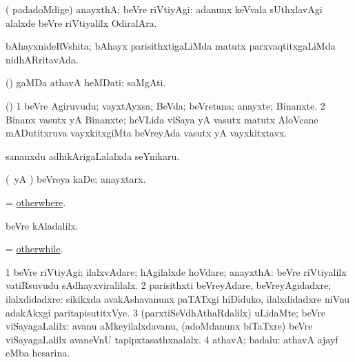 \bentry
{}
\gl{\kirxvi}
\bmng
( padadoMdige) anayxthA; beVre riVtiyAgi:  adanunx keVvala sUthxlavAgi alalxde beVre riVtiyalilx OdiralAra. 
\emng
\eentry

\bentry
{}
\gl{\gu}
\bmng
bAhayxnideRVshita; bAhayx parisithxtigaLiMda matutx parxvaqtitxgaLiMda nidhARritavAda. 
\emng
\eentry

\bentry
{}
\gl{\nA}
\bmng
(\AmA) gaMDa athavA heMDati; saMgAti. 
\emng
\eentry

\bentry
{}
\gl{\nA}
\bmng
(\viparx) 
\bnum
\num{1} beVre Agiruvudu; vayxtAyxsa; BeVda; beVretana; anayxte; Binanxte. 
\num{2} Binanx vasutx yA Binanxte; heVLida viSaya yA vasutx matutx AloVcane mADutitxruva vayxkitxgiMta beVreyAda vasutx yA vayxkitxtavx. 
\enum
\emng
\eentry

\bentry
{}
\gl{\nA}
\bmng
sananxdu adhikArigaLalalxda seYnikaru. 
\emng
\eentry

\bentry
{}
\gl{\kirxvi}
\bmng
(\pArxparx\ yA \kAparx) beVreya kaDe; anayxtarx. 
\emng
\eentry

\bentry
{}
\gl{\kirxvi}
\bmng
= \hyperlink{otherwhere}{otherwhere}. 
\emng
\eentry

\bentry
{}
\gl{\kirxvi}
\bmng
beVre kAladalilx. 
\emng
\eentry

\bentry
{}
\gl{\kirxvi}
\bmng
= \hyperlink{otherwhile}{otherwhile}. 
\emng
\eentry

\bentry
{}
\gl{\kirxvi}
\bmng
\bnum
\num{1} beVre riVtiyAgi; ilalxvAdare; hAgilalxde hoVdare; anayxthA:  beVre riVtiyalilx vatiRsuvudu sAdhayxviralilalx. 
\num{2} parisithxti beVreyAdare, beVreyAgidadxre; ilalxdidadxre:  sikikxda avakAshavanunx paTATxgi hiDiduko, ilalxdidadxre niVnu adakAkxgi paritapisutitxVye. 
\num{3} (parxtiSeVdhAthaRdalilx) uLidaMte; beVre viSayagaLalilx:  avanu aMkeyilalxdavanu, (adoMdanunx biTaTxre) beVre viSayagaLalilx avaneVnU tapipxtasathxnalalx. 
\num{4} athavA; badalu:  athavA ajayf eMba hesarina. 
\enum
\emng
\eentry

